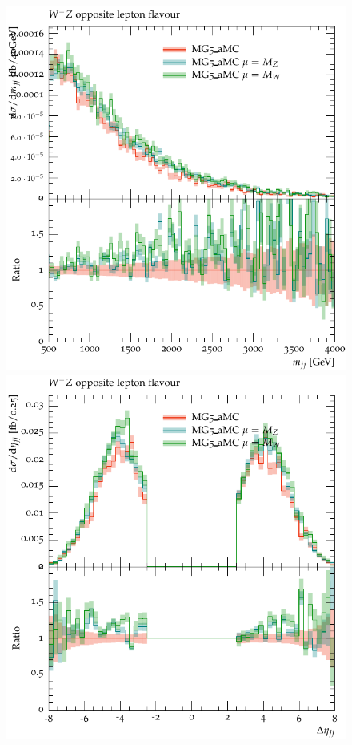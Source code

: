 \documentclass[11pt]{cernrep}
\begin{document}
\begin{figure}[htbp]
\begin{center}
   \includegraphics[scale=0.5]{figs/MG_WmZ_OF_mjj}
   \includegraphics[scale=0.5]{figs/MG_WmZ_OF_dEtajj}

\end{center}
\end{figure}
\end{document}
